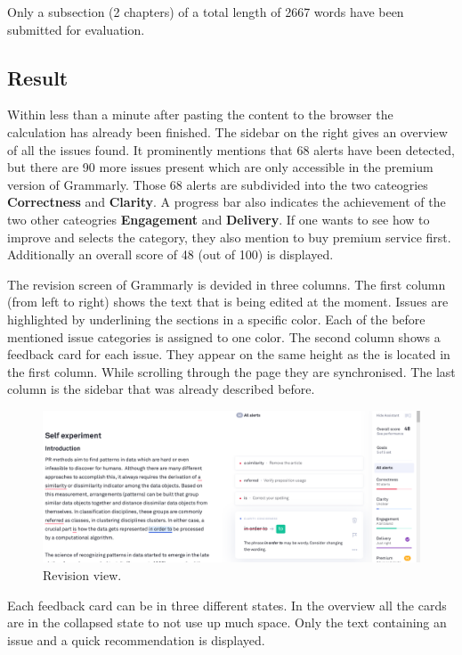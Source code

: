 \documentclass[runningheads]{llncs}
\let\OldTextregistered\textregistered
\renewcommand{\textregistered}{\OldTextregistered\xspace}%
\begin{document}
Only a subsection (2 chapters) of a total length of 2667 words have been submitted for evaluation.

\subsection{Result}
Within less than a minute after pasting the content to the browser the calculation has already been finished. The sidebar on the right gives an overview of all the issues found. It prominently mentions that 68 alerts have been detected, but there are 90 more issues present which are only accessible in the premium version of Grammarly\textregistered. Those 68 alerts are subdivided into the two cateogries \textbf{Correctness} and \textbf{Clarity}. A progress bar also indicates the achievement of the two other cateogries \textbf{Engagement} and \textbf{Delivery}. If one wants to see how to improve and selects the category, they also mention to buy premium service first. Additionally an overall score of 48 (out of 100) is displayed.

The revision screen of Grammarly\textregistered is devided in three columns. The first column (from left to right) shows the text that is being edited at the moment. Issues are highlighted by underlining the sections in a specific color. Each of the before mentioned issue categories is assigned to one color. The second column shows a feedback card for each issue. They appear on the same height as the is located in the first column. While scrolling through the page they are synchronised. The last column  is the sidebar that was already described before. 

\begin{figure}[H]
  \includegraphics[width=\linewidth]{images/view.png}
  \caption{Revision view.}
  \label{fig:revision}
\end{figure}

Each feedback card can be in three different states. In the overview all the cards are in the collapsed state to not use up much space. Only the text containing an issue and a quick recommendation is displayed.
\end{document}
